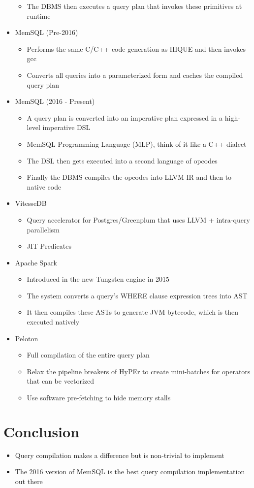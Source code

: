 \documentclass[11pt]{article}
\begin{document}
\begin{itemize}
\begin{itemize}
        \item The DBMS then executes a query plan that invokes these primitives at runtime
    \end{itemize}
    \item MemSQL (Pre-2016)
    \begin{itemize}
        \item Performs the same C/C++ code generation as HIQUE and then invokes gcc
        \item Converts all queries into a parameterized form and caches the compiled query plan
    \end{itemize}
    \item MemSQL (2016 - Present)
    \begin{itemize}
        \item A query plan is converted into an imperative plan expressed in a high-level imperative DSL
        \item MemSQL Programming Language (MLP), think of it like a C++ dialect
        \item The DSL then gets executed into a second language of opcodes
        \item Finally the DBMS compiles the opcodes into LLVM IR and then to native code
    \end{itemize}
    \item VitesseDB
    \begin{itemize}
        \item Query accelerator for Postgres/Greenplum that uses LLVM + intra-query parallelism
        \item JIT Predicates
    \end{itemize}
    \item Apache Spark
    \begin{itemize}
        \item Introduced in the new Tungsten engine in 2015
        \item The system converts a query's WHERE clause expression trees into AST
        \item It then compiles these ASTs to generate JVM bytecode, which is then executed natively
    \end{itemize}
    \item Peloton
    \begin{itemize}
        \item Full compilation of the entire query plan
        \item Relax the pipeline breakers of HyPEr to create mini-batches for operators that can be vectorized
        \item Use software pre-fetching to hide memory stalls
    \end{itemize}
\end{itemize}

\section{Conclusion}
\begin{itemize}
    \item Query compilation makes a difference but is non-trivial to implement
    \item The 2016 version of MemSQL is the best query compilation implementation out there
\end{itemize}
\end{document}
